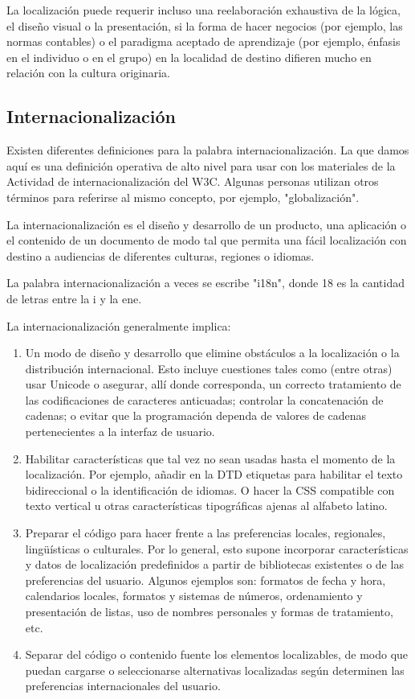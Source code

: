 \begin{enumerate}
La localización puede requerir incluso una reelaboración exhaustiva de la lógica, el diseño visual o la presentación, si la forma de hacer negocios (por ejemplo, las normas contables) o el paradigma aceptado de aprendizaje (por ejemplo, énfasis en el individuo o en el grupo) en la localidad de destino difieren mucho en relación con la cultura originaria.

\subsection{Internacionalización}

Existen diferentes definiciones para la palabra internacionalización. La que damos aquí es una definición operativa de alto nivel para usar con los materiales de la Actividad de internacionalización del W3C. Algunas personas utilizan otros términos para referirse al mismo concepto, por ejemplo, "globalización".

La internacionalización es el diseño y desarrollo de un producto, una aplicación o el contenido de un documento de modo tal que permita una fácil localización con destino a audiencias de diferentes culturas, regiones o idiomas.
\begin{remark}
	La palabra internacionalización a veces se escribe "i18n", donde 18 es la cantidad de letras entre la i y la ene.
\end{remark}

La internacionalización generalmente implica:

\begin{enumerate}
	\item Un modo de diseño y desarrollo que elimine obstáculos a la localización o la distribución internacional. Esto incluye cuestiones tales como (entre otras) usar Unicode o asegurar, allí donde corresponda, un correcto tratamiento de las codificaciones de caracteres anticuadas; controlar la concatenación de cadenas; o evitar que la programación dependa de valores de cadenas pertenecientes a la interfaz de usuario.
	\item Habilitar características que tal vez no sean usadas hasta el momento de la localización. Por ejemplo, añadir en la DTD etiquetas para habilitar el texto bidireccional o la identificación de idiomas. O hacer la CSS compatible con texto vertical u otras características tipográficas ajenas al alfabeto latino.
	\item Preparar el código para hacer frente a las preferencias locales, regionales, lingüísticas o culturales. Por lo general, esto supone incorporar características y datos de localización predefinidos a partir de bibliotecas existentes o de las preferencias del usuario. Algunos ejemplos son: formatos de fecha y hora, calendarios locales, formatos y sistemas de números, ordenamiento y presentación de listas, uso de nombres personales y formas de tratamiento, etc.
	\item Separar del código o contenido fuente los elementos localizables, de modo que puedan cargarse o seleccionarse alternativas localizadas según determinen las preferencias internacionales del usuario.
\end{enumerate}


\end{enumerate}

